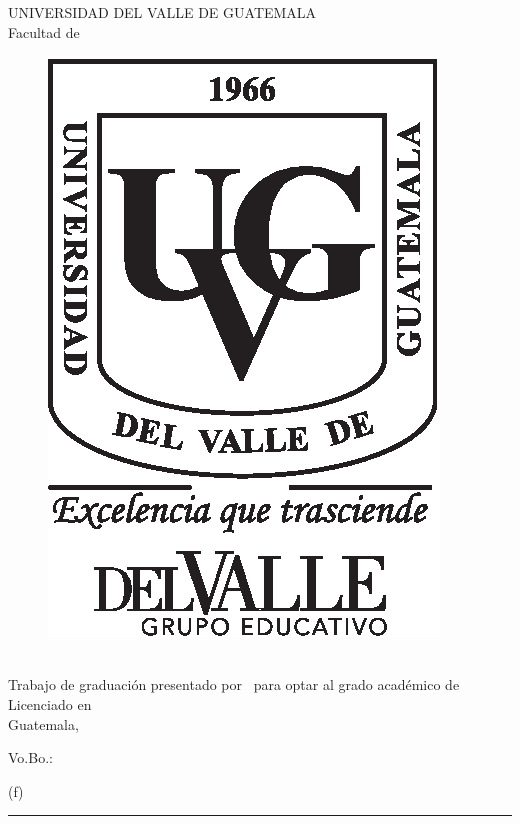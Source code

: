 \documentclass[11pt, letterpaper, twoside, openright]{report}
\begin{document}
	    \newpage
	    \cleardoublepage{}
	    \pagecolor{white}
    	\color{black}
    	\setcounter{page}{1}
    	\thispagestyle{empty}
    	\begin{center}
    		\LARGE UNIVERSIDAD DEL VALLE DE GUATEMALA\\
    		\LARGE Facultad de \uvgfacultad \\[0.75cm]
    	\end{center}
    	\begin{figure}[h]
    		\begin{center}
    		\includegraphics[height=5.5 cm]{plantilla/escudoUVGnegro.eps}
    		\vspace{0.5in}
    		\end{center}
    	\end{figure}
    	\begin{center}
    		\Large \textbf{\nohyphens{\titulotesis}} \\
    		\vfill
    		\Large \nohyphens{Trabajo de graduación presentado por \nombreestudiante \ para optar al grado académico de Licenciado en \uvgcarrera} \\
    		\vfill
    		\large Guatemala, \\
    		\vspace{1em}
    		\anoentrega
    	\end{center}
    \fi
\fi

\ifdefined\CAPfirmas
	\newpage
	\cleardoublepage{}
	\thispagestyle{empty}
	\vspace*{0.5in}
	\large Vo.Bo.:\\[1cm]
	\begin{center}
		(f) \rule[1pt]{4 in}{1pt}\\
		\nombreasesor
	\end{center}
	\vspace{1in}
\end{document}

